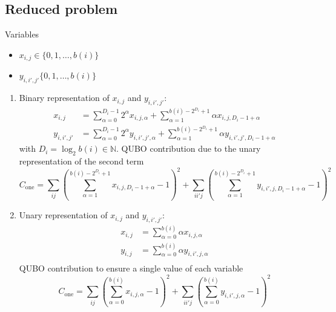 \documentclass{article}
\begin{document}
\subsection{Reduced problem}
Variables
\begin{itemize}
    \item $x_{i, j} \in \{0, 1, \dots, b(i)\}$
    \item $y_{i, i', j'} \{0, 1, \dots, b(i)\}$
\end{itemize}
\begin{enumerate}
    \item 
    Binary representation of $x_{i, j}$ and $y_{i, i', j'}$:
    \begin{align*}
        x_{i, j} & = \sum_{\alpha = 0}^{D_i - 1} 2^\alpha x_{i, j, \alpha} +  \sum_{\alpha=1}^{b(i) - 2^{D_i} + 1}\alpha x_{i, j, D_i - 1 + \alpha} \\
        y_{i, i', j'} & = \sum_{\alpha = 0}^{D_i - 1} 2^\alpha y_{i, i', j', \alpha} + \sum_{\alpha=1}^{b(i) - 2^{D_i} + 1} \alpha y_{i, i', j', D_i - 1 + \alpha}
    \end{align*}
    with $D_i = \log_2 b(i) \in \mathbb{N}$.
    QUBO contribution due to the unary representation of the second term
    \begin{equation*}
        C_\text{one} = \sum_{ij} \left( \sum_{\alpha = 1}^{b(i) - 2^{D_i} + 1} x_{i, j, D_i -1 + \alpha} - 1 \right)^2
        + \sum_{ii'j} \left( \sum_{\alpha = 1}^{b(i) - 2^{D_i} + 1} y_{i, i', j, D_i -1 + \alpha} - 1 \right)^2
    \end{equation*}
    \item 
    Unary representation of $x_{i, j}$ and $y_{i, i', j'}$:
    \begin{align*}
        x_{i, j} & = \sum_{\alpha = 0}^{b(i)} \alpha x_{i, j, \alpha} \\
        y_{i, j} & = \sum_{\alpha = 0}^{b(i)} \alpha y_{i, i', j, \alpha} \\
    \end{align*}
    \noindent
    QUBO contribution to ensure a single value of each variable
    \begin{equation*}
        C_\text{one} = \sum_{ij} \left( \sum_{\alpha = 0}^{b(i)} x_{i, j, \alpha} - 1 \right)^2
                     + \sum_{ii'j} \left( \sum_{\alpha = 0}^{b(i)} y_{i, i', j, \alpha} - 1 \right)^2
    \end{equation*}
\end{enumerate}
\end{document}
